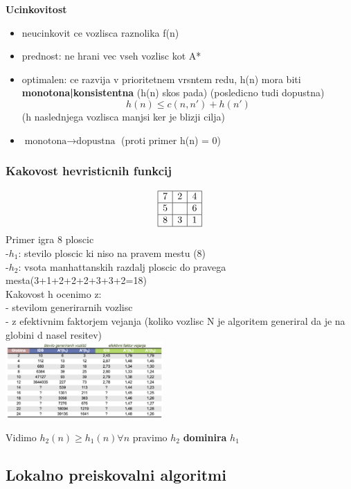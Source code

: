 \textbf{Ucinkovitost}
\begin{itemize}[noitemsep,topsep=0pt,leftmargin=*]
    \item neucinkovit ce vozlisca raznolika f(n)
    \item prednost: ne hrani vec vseh vozlisc kot A*
    \item optimalen: ce razvija v prioritetnem vrsntem redu, h(n) mora biti \textbf{monotona|konsistentna} (h(n) skos pada) (posledicno tudi dopustna) $$h(n) \leq c(n,n') + h(n')$$ (h naslednjega vozlisca manjsi ker je blizji cilja)
    \item $\text{monotona} \rightarrow \text{dopustna}$ (proti primer h(n) = 0)
\end{itemize}


\subsubsection{Kakovost hevristicnih funkcij}
$$\begin{array}{|c|c|c|}
    \hline
    7 & 2 & 4 \\
    \hline 
    5 & & 6 \\
    \hline 
    8 & 3 & 1 \\
    \hline 
\end{array}\\$$
Primer igra 8 ploscic\\
-$h_1$: stevilo ploscic ki niso na pravem mestu (8)\\
-$h_2$: vsota manhattanskih razdalj ploscic do pravega mesta(3+1+2+2+2+3+3+2=18)\\
Kakovost h ocenimo z:\\
- stevilom generirarnih vozlisc\\
- z efektivnim faktorjem vejanja (koliko vozlisc N je algoritem generiral da je na globini d nasel resitev)\\

\includegraphics[width=6cm]{./images/kakovost-h(n).png}

Vidimo $h_2(n) \geq h_1(n) \forall n$ pravimo $h_2$ \textbf{dominira} $h_1$\\


\subsection{Lokalno preiskovalni algoritmi}

